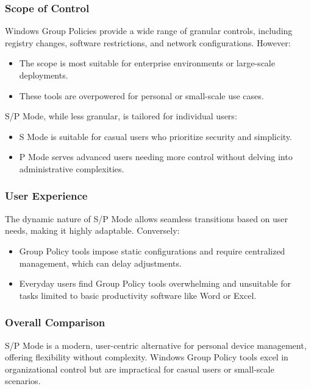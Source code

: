 \subsubsection{Scope of Control}
Windows Group Policies provide a wide range of granular controls, including registry changes, software restrictions, and network configurations. However:
\begin{itemize}
    \item The scope is most suitable for enterprise environments or large-scale deployments.
    \item These tools are overpowered for personal or small-scale use cases.
\end{itemize}
S/P Mode, while less granular, is tailored for individual users:
\begin{itemize}
    \item S Mode is suitable for casual users who prioritize security and simplicity.
    \item P Mode serves advanced users needing more control without delving into administrative complexities.
\end{itemize}

\subsubsection{User Experience}
The dynamic nature of S/P Mode allows seamless transitions based on user needs, making it highly adaptable. Conversely:
\begin{itemize}
    \item Group Policy tools impose static configurations and require centralized management, which can delay adjustments.
    \item Everyday users find Group Policy tools overwhelming and unsuitable for tasks limited to basic productivity software like Word or Excel.
\end{itemize}

\subsubsection{Overall Comparison}
S/P Mode is a modern, user-centric alternative for personal device management, offering flexibility without complexity. Windows Group Policy tools excel in organizational control but are impractical for casual users or small-scale scenarios.

